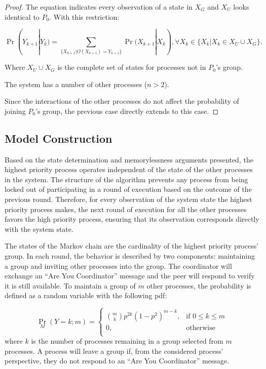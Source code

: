 \begin{proof}
The equation indicates every observation of a state in $X_G$ and $X_U$ looks identical to $P_0$.
With this restriction:

\begin{equation}
\Pr(Y_{k+1} | Y_{k}) = \sum_{\{X_{k+1} | O(X_{k+1}) = Y_{k+1}\}} \Pr(X_{k+1} | X_{k}), \forall X_k \in \{X_k | X_k \in X_U \cup X_G\}.
\end{equation}

Where $X_U \cup X_G$ is the complete set of states for processes not in $P_0$'s group.

\begin{case}
    The system has a number of other processes ($n > 2$).
\end{case}

Since the interactions of the other processes do not affect the probability of joining $P_0$'s group, the previous case directly extends to this case.

\end{proof}

\subsection{Model Construction}

Based on the state determination and memorylessness arguments presented, the highest priority process operates independent of the state of the other processes in the system.
The structure of the algorithm prevents any process from being locked out of participating in a round of execution based on the outcome of the previous round.
Therefore, for every observation of the system state the highest priority process makes, the next round of execution for all the other processes favors the high priority process, ensuring that its observation corresponds directly with the system state.

The states of the Markov chain are the cardinality of the highest priority process' group.
In each round, the behavior is described by two components: maintaining a group and inviting other processes into the group.
The coordinator will exchange an ``Are You Coordinator'' message and the peer will respond to verify it is still available.
To maintain a group of $m$ other processes, the probability is defined as a random variable with the following \ac{pdf}:

\begin{equation}
 \Pr_{M}(Y=k; m) =
   \begin{cases}
    \binom{m}{k} p^{2k}(1-p^2)^{m-k}, & \text{if } 0 \leq k \leq m \\
    0,                                & \text{otherwise} \\
  \end{cases}
\end{equation}%
where $k$ is the number of processes remaining in a group selected from $m$ processes.
A process will leave a group if, from the considered process' perspective, they do not respond to an ``Are You Coordinator'' message.

